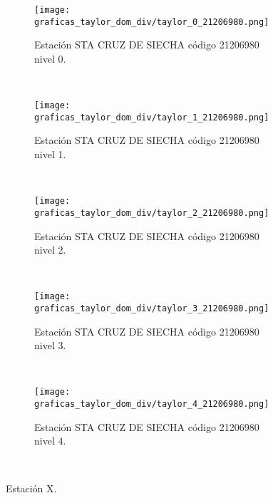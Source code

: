 \begin{figure}[H]\ContinuedFloat
\centering
\begin{subfigure}[normla]{0.4\textwidth}
\texttt{[image: graficas\_taylor\_dom\_div/taylor\_0\_21206980.png]}
\caption{Estación STA CRUZ DE SIECHA  código 21206980 nivel 0.}
\end{subfigure}
~
\begin{subfigure}[normla]{0.4\textwidth}
\texttt{[image: graficas\_taylor\_dom\_div/taylor\_1\_21206980.png]}
\caption{Estación STA CRUZ DE SIECHA  código 21206980 nivel 1.}
\end{subfigure}
~
\begin{subfigure}[normla]{0.4\textwidth}
\texttt{[image: graficas\_taylor\_dom\_div/taylor\_2\_21206980.png]}
\caption{Estación STA CRUZ DE SIECHA  código 21206980 nivel 2.}
\end{subfigure}
~
\begin{subfigure}[normla]{0.4\textwidth}
\texttt{[image: graficas\_taylor\_dom\_div/taylor\_3\_21206980.png]}
\caption{Estación STA CRUZ DE SIECHA  código 21206980 nivel 3.}
\end{subfigure}
~
\begin{subfigure}[normla]{0.4\textwidth}
\texttt{[image: graficas\_taylor\_dom\_div/taylor\_4\_21206980.png]}
\caption{Estación STA CRUZ DE SIECHA  código 21206980 nivel 4.}
\end{subfigure}
~


    \caption{Estación X.}
    \label{fig:taylor_dom_dea5}
\end{figure}